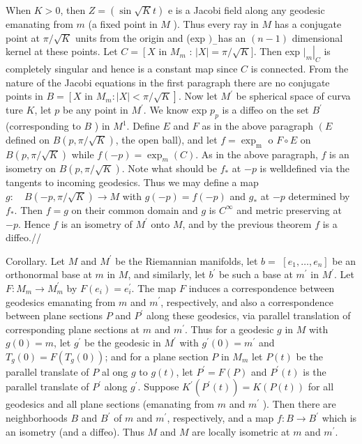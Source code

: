 \documentclass[10pt]{article}
\begin{document}
When $K>0$, then $Z=(\sin \sqrt{K} t)$ e is a Jacobi field along any geodesic emanating from $m$ (a fixed point in $M$ ). Thus every ray in $M$ has a conjugate point at $\pi / \sqrt{K}$ units from the origin and (exp $)_{-}$has an $(n-1)$ dimensional kernel at these points. Let $C=\left[X\right.$ in $M_{m}$ : $|X|=\pi / \sqrt{K}]$. Then exp $\left.\left.\right|_{m}\right|_{C}$ is completely singular and hence is a constant map since $C$ is connected. From the nature of the Jacobi equations in the first paragraph there are no conjugate points in $B=\left[X\right.$ in $\left.M_{m}:|X|<\pi / \sqrt{K}\right]$. Now let $M^{\prime}$ be spherical space of curva ture $K$, let $p$ be any point in $M^{\prime}$. We know exp $p_{p}$ is a diffeo on the set $B^{\prime}$ (corresponding to $B$ ) in $M^{1}$. Define $E$ and $F$ as in the above paragraph $\left(E\right.$ defined on $B(p, \pi / \sqrt{K})$, the open ball), and let $f=\exp _{\mathrm{m}}$ o $F \circ E$ on $B(p, \pi / \sqrt{K})$ while $f(-p)=\exp _{m}(C)$. As in the above paragraph, $f$ is an isometry on $B(p, \pi / \sqrt{K})$. Note what should be $f_{*}$ at $-p$ is welldefined via the tangents to incoming geodesics. Thus we may define a map $g: \quad B(-p, \pi / \sqrt{K}) \rightarrow M$ with $g(-p)=f(-p)$ and $g_{*}$ at $-p$ determined by $f_{*} .$ Then $f=g$ on their common domain and $g$ is $C^{\infty}$ and metric preserving at $-p$. Hence $f$ is an isometry of $M^{\prime}$ onto $M$, and by the previous theorem $f$ is a diffeo.//

Corollary. Let $M$ and $M^{\prime}$ be the Riemannian manifolds, let $b=$ $\left[e_{1}, \ldots, e_{n}\right]$ be an orthonormal base at $m$ in $M$, and similarly, let $b^{\prime}$ be such a base at $m^{\prime}$ in $M^{\prime}$. Let $F: M_{m} \rightarrow M_{m}^{\prime}$ by $F\left(e_{i}\right)=e_{i}^{\prime}$. The map $F$ induces a correspondence between geodesics emanating from $m$ and $m^{\prime}$, respectively, and also a correspondence between plane sections $P$ and $P^{\prime}$ along these geodesics, via parallel translation of corresponding plane sections at $m$ and $m^{\prime}$. Thus for a geodesic $g$ in $M$ with $g(0)=m$, let $g^{\prime}$ be the geodesic in $M^{\prime}$ with $g^{\prime}(0)=m^{\prime}$ and $T_{g}(0)=F\left(T_{g}(0)\right)$; and for a plane section $P$ in $M_{m}$ let $P(t)$ be the parallel translate of $P$ al ong $g$ to $g(t)$, let $P^{\prime}=F(P)$ and $P^{\prime}(t)$ is the parallel translate of $P^{\prime}$ along $g^{\prime}$. Suppose $K^{\prime}\left(P^{\prime}(t)\right)=K(P(t))$ for all geodesics and all plane sections (emanating from $m$ and $m^{\prime}$ ). Then there are neighborhoods $B$ and $B^{\prime}$ of $m$ and $m^{\prime}$, respectively, and a map $f: B \rightarrow B^{\prime}$ which is an isometry (and a diffeo). Thus $M$ and $M$ are locally isometric at $m$ and $m^{\prime}$.
\end{document}

